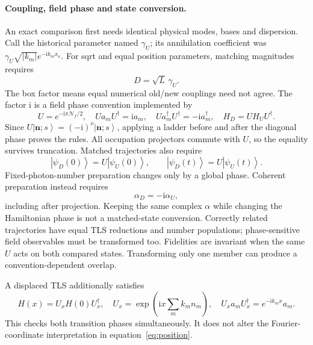\documentclass[11pt,a4paper]{article}
\newcommand{\ket}[1]{\left|#1\right\rangle}
\newcommand{\ii}{\mathrm{i}}
\newcommand{\code}[1]{\texttt{\detokenize{#1}}}
\begin{document}
\paragraph{Coupling, field phase and state conversion.}
An exact comparison first needs identical physical modes, bases and dispersion.
Call the historical parameter named \code{g} $\gamma_U$; its annihilation
coefficient was $\gamma_U\sqrt{|k_m|}e^{-\ii k_mx_a}$.
For sqrt and equal position parameters, matching magnitudes requires
\begin{equation}
 D=\sqrt L\,\gamma_U.
 \label{eq:Dconversion}
\end{equation}
The box factor means equal numerical old/new couplings need not agree.
The factor $\ii$ is a field phase convention implemented by
\begin{equation}
 U=e^{-\ii\pi\mathcal N_f/2},\quad Ua_mU^\dagger=\ii a_m,\quad
 Ua_m^\dagger U^\dagger=-\ii a_m^\dagger,\quad H_D=UH_UU^\dagger.
 \label{eq:gauge}
\end{equation}
Since $U\ket{\bm n;s}=(-\ii)^\nu\ket{\bm n;s}$, applying a ladder before
and after the diagonal phase proves the rules. All occupation projectors
commute with $U$, so the equality survives truncation. Matched trajectories
also require
\begin{equation}
 \ket{\psi_D(0)}=U\ket{\psi_U(0)},\qquad
 \ket{\psi_D(t)}=U\ket{\psi_U(t)}.
 \label{eq:trajectorygauge}
\end{equation}
Fixed-photon-number preparation changes only by a global phase. Coherent
preparation instead requires
\begin{equation}
 \alpha_D=-\ii\alpha_U,
 \label{eq:alphaconversion}
\end{equation}
including after projection. Keeping the same complex $\alpha$ while changing
the Hamiltonian phase is not a matched-state conversion. Correctly related
trajectories have equal TLS reductions and number populations; phase-sensitive
field observables must be transformed too. Fidelities are invariant when the
same $U$ acts on both compared states. Transforming only one member can
produce a convention-dependent overlap.

A displaced TLS additionally satisfies
\begin{equation}
 H(x)=U_xH(0)U_x^\dagger,\quad
 U_x=\exp\!\left(\ii x\sum_m k_mn_m\right),\quad
 U_xa_mU_x^\dagger=e^{-\ii k_mx}a_m.
 \label{eq:translationgauge}
\end{equation}
This checks both transition phases simultaneously. It does not alter the
Fourier-coordinate interpretation in equation~\eqref{eq:position}.
\end{document}
